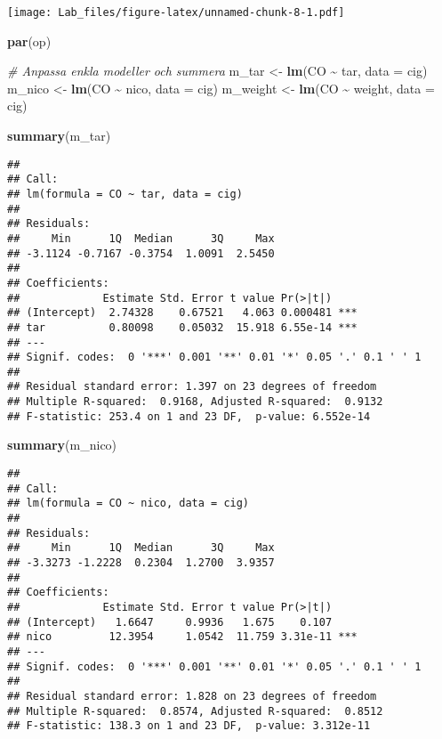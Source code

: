 \documentclass[
  11pt,
]{article}
\newenvironment{Shaded}{\begin{snugshade}}{\end{snugshade}}
\newcommand{\AttributeTok}[1]{\textcolor[rgb]{0.13,0.29,0.53}{#1}}
\newcommand{\CommentTok}[1]{\textcolor[rgb]{0.56,0.35,0.01}{\textit{#1}}}
\newcommand{\FunctionTok}[1]{\textcolor[rgb]{0.13,0.29,0.53}{\textbf{#1}}}
\newcommand{\NormalTok}[1]{#1}
\newcommand{\OtherTok}[1]{\textcolor[rgb]{0.56,0.35,0.01}{#1}}
\newcommand{\SpecialCharTok}[1]{\textcolor[rgb]{0.81,0.36,0.00}{\textbf{#1}}}
\begin{document}
\texttt{[image: Lab\_files/figure-latex/unnamed-chunk-8-1.pdf]}

\begin{Shaded}
\begin{Highlighting}[]
\FunctionTok{par}\NormalTok{(op)}

\CommentTok{\# Anpassa enkla modeller och summera}
\NormalTok{m\_tar    }\OtherTok{\textless{}{-}} \FunctionTok{lm}\NormalTok{(CO }\SpecialCharTok{\textasciitilde{}}\NormalTok{ tar,    }\AttributeTok{data =}\NormalTok{ cig)}
\NormalTok{m\_nico   }\OtherTok{\textless{}{-}} \FunctionTok{lm}\NormalTok{(CO }\SpecialCharTok{\textasciitilde{}}\NormalTok{ nico,   }\AttributeTok{data =}\NormalTok{ cig)}
\NormalTok{m\_weight }\OtherTok{\textless{}{-}} \FunctionTok{lm}\NormalTok{(CO }\SpecialCharTok{\textasciitilde{}}\NormalTok{ weight, }\AttributeTok{data =}\NormalTok{ cig)}

\FunctionTok{summary}\NormalTok{(m\_tar)}
\end{Highlighting}
\end{Shaded}

\begin{verbatim}
## 
## Call:
## lm(formula = CO ~ tar, data = cig)
## 
## Residuals:
##     Min      1Q  Median      3Q     Max 
## -3.1124 -0.7167 -0.3754  1.0091  2.5450 
## 
## Coefficients:
##             Estimate Std. Error t value Pr(>|t|)    
## (Intercept)  2.74328    0.67521   4.063 0.000481 ***
## tar          0.80098    0.05032  15.918 6.55e-14 ***
## ---
## Signif. codes:  0 '***' 0.001 '**' 0.01 '*' 0.05 '.' 0.1 ' ' 1
## 
## Residual standard error: 1.397 on 23 degrees of freedom
## Multiple R-squared:  0.9168, Adjusted R-squared:  0.9132 
## F-statistic: 253.4 on 1 and 23 DF,  p-value: 6.552e-14
\end{verbatim}

\begin{Shaded}
\begin{Highlighting}[]
\FunctionTok{summary}\NormalTok{(m\_nico)}
\end{Highlighting}
\end{Shaded}

\begin{verbatim}
## 
## Call:
## lm(formula = CO ~ nico, data = cig)
## 
## Residuals:
##     Min      1Q  Median      3Q     Max 
## -3.3273 -1.2228  0.2304  1.2700  3.9357 
## 
## Coefficients:
##             Estimate Std. Error t value Pr(>|t|)    
## (Intercept)   1.6647     0.9936   1.675    0.107    
## nico         12.3954     1.0542  11.759 3.31e-11 ***
## ---
## Signif. codes:  0 '***' 0.001 '**' 0.01 '*' 0.05 '.' 0.1 ' ' 1
## 
## Residual standard error: 1.828 on 23 degrees of freedom
## Multiple R-squared:  0.8574, Adjusted R-squared:  0.8512 
## F-statistic: 138.3 on 1 and 23 DF,  p-value: 3.312e-11
\end{verbatim}
\end{document}
